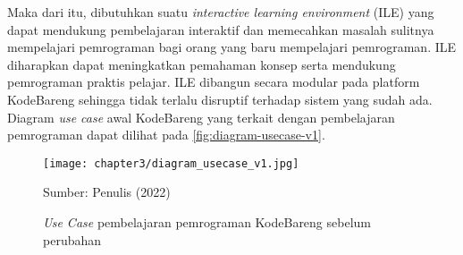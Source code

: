 Maka dari itu, dibutuhkan suatu \textit{interactive learning environment} (ILE) yang dapat mendukung pembelajaran interaktif dan memecahkan masalah sulitnya mempelajari pemrograman bagi orang yang baru mempelajari pemrograman. ILE diharapkan dapat meningkatkan pemahaman konsep serta mendukung pemrograman praktis pelajar. ILE dibangun secara modular pada platform KodeBareng sehingga tidak terlalu disruptif terhadap sistem yang sudah ada. Diagram \textit{use case} awal KodeBareng yang terkait dengan pembelajaran pemrograman dapat dilihat pada \autoref{fig:diagram-usecase-v1}.

\begin{figure}[!h]
  \centering
  \texttt{[image: chapter3/diagram\_usecase\_v1.jpg]}
  \caption{\textit{Use Case} pembelajaran pemrograman KodeBareng sebelum perubahan} \label{fig:diagram-usecase-v1}
  Sumber: Penulis (2022)
\end{figure}